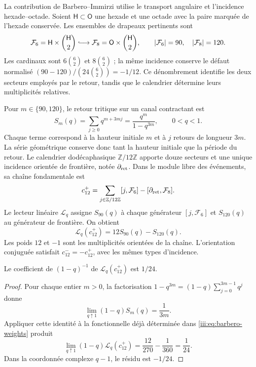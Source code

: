 La contribution de Barbero--Immirzi utilise le transport angulaire et
l’incidence hexade--octade. Soient $\mathsf H\subset\mathsf O$ une hexade
et une octade avec la paire marquée de l’hexade conservée. Les ensembles de
drapeaux pertinents sont
\begin{equation}
 \mathcal F_6=\mathsf H\times\binom{\mathsf H}{2}
 \lhook\joinrel\longrightarrow
 \mathcal F_8=\mathsf O\times\binom{\mathsf H}{2},
 \qquad |\mathcal F_6|=90,\quad |\mathcal F_8|=120.
 \label{iii:eq:barbero-flags}
\end{equation}
Les cardinaux sont $6\binom62$ et $8\binom62$ ; la même incidence
conserve le défaut normalisé
$(90-120)/(24\binom62)=-1/12$. Ce dénombrement identifie les deux secteurs
employés par le retour, tandis que le calendrier détermine leurs
multiplicités relatives.

Pour $m\in\{90,120\}$, le retour tritique sur un canal contractant est
\begin{equation}
 S_m(q)=\sum_{j\geq0}q^{m+3mj}
       =\frac{q^m}{1-q^{3m}},\qquad 0<q<1.
 \label{iii:eq:barbero-return-series}
\end{equation}
Chaque terme correspond à la hauteur initiale $m$ et à $j$ retours de
longueur $3m$. La série géométrique conserve donc tant la hauteur
initiale que la période du retour. Le calendrier dodécaphasique
$\mathbb Z/12\mathbb Z$ apporte douze secteurs et une unique incidence
orientée de frontière, notée $\partial_{\rm ret}$. Dans le module
libre des événements, sa chaîne fondamentale est
\begin{equation}
 c_{12}^{+}
 =\sum_{j\in\mathbb Z/12\mathbb Z}[j,\mathcal F_6]
  -[\partial_{\rm ret},\mathcal F_8].
 \label{iii:eq:barbero-cycle}
\end{equation}
Le lecteur linéaire $\mathscr L_q$ assigne $S_{90}(q)$ à chaque générateur
$[j,\mathcal F_6]$ et $S_{120}(q)$ au générateur de frontière. On obtient
\begin{equation}
 \mathscr L_q(c_{12}^{+})=12S_{90}(q)-S_{120}(q).
 \label{iii:eq:barbero-weights}
\end{equation}
Les poids $12$ et $-1$ sont les multiplicités orientées de la chaîne.
L’orientation conjuguée satisfait $c_{12}^{-}=-c_{12}^{+}$, avec les
mêmes types d’incidence.

\begin{proposition}
\label{iii:prop:barbero-pole}
Le coefficient de $(1-q)^{-1}$ de
$\mathscr L_q(c_{12}^{+})$ est $1/24$.
\end{proposition}
\begin{proof}
Pour chaque entier $m>0$, la factorisation
$1-q^{3m}=(1-q)\sum_{j=0}^{3m-1}q^j$ donne
\[
 \lim_{q\uparrow1}(1-q)S_m(q)=\frac1{3m}.
\]
Appliquer cette identité à la fonctionnelle déjà déterminée dans
\eqref{iii:eq:barbero-weights} produit
\begin{equation}
 \lim_{q\uparrow1}(1-q)\mathscr L_q(c_{12}^{+})
 =\frac{12}{270}-\frac1{360}=\frac1{24}.
 \label{iii:eq:barbero-pole}
\end{equation}
Dans la coordonnée complexe $q-1$, le résidu est $-1/24$.
\end{proof}

